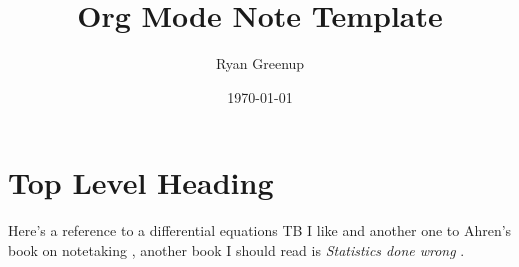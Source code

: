 \documentclass[a4paper,11pt,twoside]{article}
\author{Ryan Greenup}
\date{\today}
\title{Org Mode Note Template}
\begin{document}
\maketitle

\section{Top Level Heading}
\label{sec:orga1281f6}

Here's a reference to a differential equations TB I like
\cite{zillMatrixExponential2009} and another one to Ahren's book on
notetaking \cite{ahrensHowTakeSmart2017}, another book I should read is
\emph{Statistics done wrong} \cite{reinhartStatisticsDoneWrong2015a}.
\end{document}

